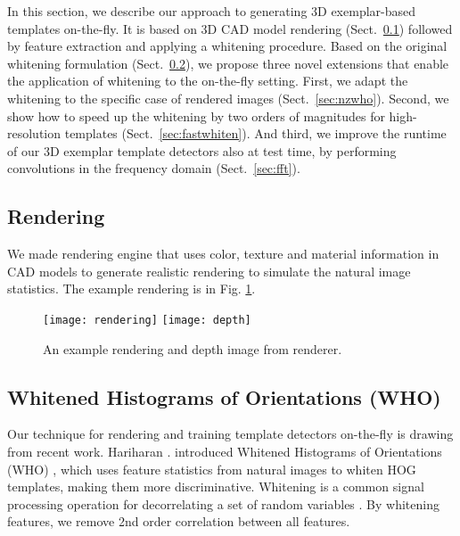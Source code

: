 In this section, we describe our approach to generating 3D
exemplar-based templates on-the-fly. It is based on 3D CAD model
rendering (Sect.~\ref{sec:rendering}) followed by feature extraction
and applying a whitening procedure. Based on the original whitening
formulation (Sect.~\ref{sec:who}), we propose three novel extensions that
enable the application of whitening to the on-the-fly setting.
%
First, we adapt the whitening to the specific case of rendered
images (Sect.~\ref{sec:nzwho}). Second, we show how to speed up the
whitening by two orders of magnitudes for high-resolution templates
(Sect.~\ref{sec:fastwhiten}). And third, we improve the runtime of our
3D exemplar template detectors also at test time, by performing
convolutions in the frequency domain (Sect.~\ref{sec:fft}).


\subsection{Rendering}
\label{sec:rendering}
We made rendering engine that uses color, texture and material information in
CAD models to generate realistic rendering to simulate the natural image
statistics. The example rendering is
in Fig. \ref{fig:rendering}. 

\begin{figure}[t]
  \begin{center}
     \texttt{[image: rendering]}
     \texttt{[image: depth]}
  \end{center}
  \caption{An example rendering and depth image from renderer.}
  \label{fig:rendering}
\end{figure}


\subsection{Whitened Histograms of Orientations (WHO)}
\label{sec:who}
Our technique for rendering and training template detectors on-the-fly
is drawing from recent work. Hariharan \etal. introduced Whitened Histograms of Orientations (WHO)
\cite{Hariharan12}, which uses feature statistics from natural images to whiten HOG
templates, making them more discriminative. Whitening is a common signal
processing operation for decorrelating a set of random variables
\cite{Martinsson05, Belouchrani00}. By whitening features, we remove 2nd order
correlation between all features. 


